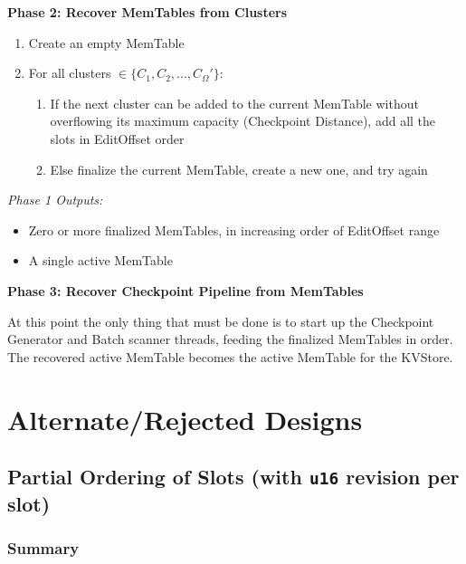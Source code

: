 \documentclass[11pt]{article}
\begin{document}
\textbf{Phase 2: Recover MemTables from Clusters}

\begin{enumerate}
	\item Create an empty MemTable
	\item For all clusters $\in \{C_1, C_2, ..., C_{\Omega}'\}$:
	\begin{enumerate}
	    \item If the next cluster can be added to the current
              MemTable without overflowing its maximum capacity
              (Checkpoint Distance), add all the slots in EditOffset
              order
	    \item Else finalize the current MemTable, create a new
              one, and try again
	\end{enumerate}
\end{enumerate}

\textit{Phase 1 Outputs:}

\begin{itemize}
\item Zero or more finalized MemTables, in increasing order of EditOffset range
\item A single active MemTable
\end{itemize}

\textbf{Phase 3: Recover Checkpoint Pipeline from MemTables}

\vspace{11pt} At this point the only thing that must be done is to
start up the Checkpoint Generator and Batch scanner threads, feeding
the finalized MemTables in order.  The recovered active MemTable
becomes the active MemTable for the KVStore.
\vspace{11pt}

\section{Alternate/Rejected Designs}

\subsection{Partial Ordering of Slots (with \texttt{u16} revision per slot)}

\subsubsection{Summary}
\end{document}

